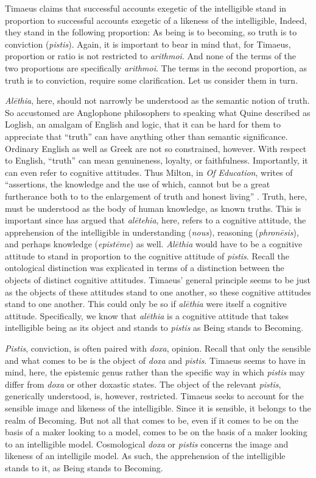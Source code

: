 Timaeus claims that successful accounts exegetic of the intelligible stand in proportion to successful accounts exegetic of a likeness of the intelligible, Indeed, they stand in the following proportion: As being is to becoming, so truth is to conviction (\emph{pistis}). Again, it is important to bear in mind that, for Timaeus, proportion or ratio is not restricted to \emph{arithmoi}. And none of the terms of the two proportions are specifically \emph{arithmoi}. The terms in the second proportion, as truth is to conviction, require some clarification. Let us consider them in turn.

\emph{Alēthia}, here, should not narrowly be understood as the semantic notion of truth. So accustomed are Anglophone philosophers to speaking what Quine described as Loglish, an amalgam of English and logic, that it can be hard for them to appreciate that ``truth'' can have anything other than semantic significance. Ordinary English as well as Greek are not so constrained, however. With respect to English, ``truth'' can mean genuineness, loyalty, or faithfulness. Importantly, it can even refer to cognitive attitudes. Thus Milton, in \emph{Of Education}, writes of ``assertions, the knowledge and the use of which, cannot but be a great furtherance both to to the enlargement of truth and honest living'' \citep[51]{Ainsworth:1928cy}. Truth, here, must be understood as the body of human knowledge, as known truths. This is important since \citet[]{Burnyeat:2005it} has argued that \emph{alētehia}, here, refers to a cognitive attitude, the apprehension of the intelligible in understanding (\emph{nous}), reasoning (\emph{phronēsis}), and perhaps knowledge (\emph{epistēme}) as well. \emph{Alēthia} would have to be a cognitive attitude to stand in proportion to the cognitive attitude of \emph{pistis}. Recall the ontological distinction was explicated in terms of a distinction between the objects of distinct cognitive attitudes. Timaeus' general principle seems to be just as the objects of these attitudes stand to one another, so these cognitive attitudes stand to one another. This could only be so if \emph{alēthia} were itself a cognitive attitude. Specifically, we know that \emph{alēthia} is a cognitive attitude that takes intelligible being as its object and stands to \emph{pistis} as Being stands to Becoming.

\emph{Pistis}, conviction, is often paired with \emph{doxa}, opinion. Recall that only the sensible and what comes to be is the object of \emph{doxa} and \emph{pistis}. Timaeus seems to have in mind, here, the epistemic genus rather than the specific way in which \emph{pistis} may differ from \emph{doxa} or other doxastic states. The object of the relevant \emph{pistis}, generically understood, is, however, restricted. Timaeus seeks to account for the sensible image and likeness of the intelligible. Since it is sensible, it belongs to the realm of Becoming. But not all that comes to be, even if it comes to be on the basis of a maker looking to a model, comes to be on the basis of a maker looking to an intelligible model. Cosmological \emph{doxa} or \emph{pistis} concerns the image and likeness of an intelligile model. As such, the apprehension of the intelligible stands to it, as Being stands to Becoming.

